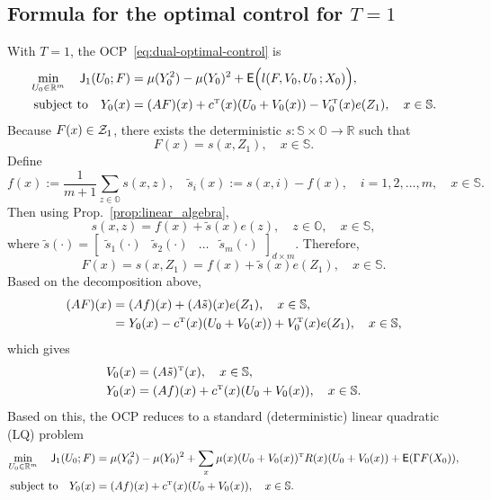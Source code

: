 \documentclass[twoside,11pt]{article}
\def\Re{\mathbb{R}}
\newcommand{\field}[1]{\mathbb{#1}}
\def\Re{\field{R}}
\def\clZ{{\cal Z}}
\def\E{{\sf E}}
\def\clZ{{\cal Z}}
\def\bS{\begin{slide}}
\def\Re{\mathbb{R}}
\def\E{{\sf E}}
\def\Prop#1{Prop.~\ref{#1}}
\def\clZ{{\cal Z}}
\renewcommand{\Re}{\mathbb{R}}
\def\clZ{{\cal Z}}
\def\E{{\sf E}}
\def\bS{\mathbb{S}}
\def\bO{\mathbb{O}}
\def\sJ{{\sf J}}
\def\tp{{\hbox{\rm\tiny T}}}
\begin{document}
\subsection{Formula for the optimal control for $T=1$}
With $T=1$, the OCP~\eqref{eq:dual-optimal-control} is
\begin{align*}
\min_{U_0\in \Re^m} \quad \sJ_1(U_0;F)  &=
\mu(Y_0^2) - \mu(Y_0)^2 + 
                                        \E \Big( l (F,V_0,U_0\,;X_0)
                                        \Big), \\
\text{subject to} \quad Y_0(x) &= (AF)(x) + c^\tp(x) (U_0 + V_0(x)) -
                                 V_0^\tp(x) e(Z_1),\quad x\in\bS.
\end{align*}
Because $F(x)\in \clZ_1$, there exists the deterministic $s:\bS\times
\bO\to\Re$ such that
\begin{equation*}
F(x) = s(x,Z_1),\quad x\in\bS.
\end{equation*}
Define
\begin{equation*}
f(x):=\frac{1}{m+1} \sum_{z\in\bO} s(x,z),\quad \tilde{s}_i(x):=
s(x,i) - f(x),\quad i=1,2,\hdots,m,\quad x\in\bS.
\end{equation*}
Then using \Prop{prop:linear_algebra}, 
\begin{equation*}
s(x,z) = f(x) + \tilde{s}(x) e(z),\quad z\in \bO,\quad x\in \bS,
\end{equation*}
where $\tilde{s}(\cdot)=\begin{bmatrix} \tilde{s}_1(\cdot) &\tilde{s}_2(\cdot)
  &\hdots &\tilde{s}_m(\cdot)  \end{bmatrix}_{d\times m}$. Therefore,
\begin{equation*}
F(x) = s(x,Z_1) = f(x) + \tilde{s}(x) e(Z_1),\quad x\in \bS.
\end{equation*}
Based on the decomposition above,
\begin{align*}
  (AF)(x) &= (Af)(x) + (A\tilde{s})(x) e(Z_1),\quad x\in \bS, \\
  &= Y_0(x) - c^\tp(x) (U_0 + V_0(x)) + V_0^\tp(x) e(Z_1),\quad x\in\bS,
\end{align*}
which gives
\begin{align*}
  V_0(x) &= (A\tilde{s})^\tp(x) ,\quad x\in\bS, \\
  Y_0(x) &= (Af)(x) + c^\tp(x) (U_0 + V_0(x)),\quad x\in\bS.
\end{align*}
Based on this, the OCP reduces to a standard (deterministic) linear
quadratic (LQ) problem
\begin{align*}
\min_{U_0\in \Re^m} \quad \sJ_1(U_0;F)  &=
\mu(Y_0^2) - \mu(Y_0)^2 + 
                                         \sum_{x} \mu(x) (U_0+V_0(x))^\tp
                                          R(x) (U_0 + V_0(x))
                                          + \E (\Gamma F(X_0)), \\
\text{subject to} \quad Y_0(x) &= (Af)(x) + c^\tp(x) (U_0 + V_0(x)),\quad x\in\bS.
\end{align*}
\end{document}
